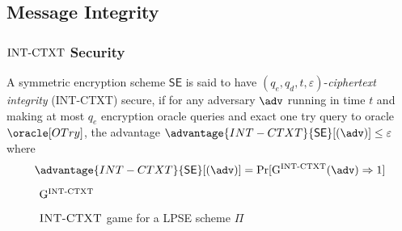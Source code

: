 \subsection{Message Integrity}
\subsubsection{$\mathrm{INT\textrm-CTXT}$ Security}
A symmetric encryption scheme $\mathsf{SE}$ is said to have $(q_e, q_d, t, \varepsilon)$-\textit{ciphertext integrity} (INT-CTXT) secure, if for any adversary $\adv$ running in time $t$ and making at most $q_e$ encryption oracle queries and exact one try query to oracle $\oracle[OTry]$,  the advantage $\advantage{INT-CTXT}{\mathsf{SE}}[(\adv)] \leq \varepsilon$ where 
$$
\advantage{INT-CTXT}{\mathsf{SE}}[(\adv)] = \Pr[\mathrm{G}^{\intctxt}(\adv) \Rightarrow 1]
$$

\begin{figure}[!h]
\centering
\begin{codeframe}[colback = white, width=10.5cm, height=6cm]{$\mathrm{G}^{\mathrm{INT\textrm-CTXT}}$}
\begin{pchstack}[space=0.5cm]
\begin{pcvstack}[space=0.3cm]

\end{pcvstack}

\begin{pcvstack}[space=0.3cm]

\end{pcvstack}
\end{pchstack}
\end{codeframe}
\caption{$\textsc{INT-CTXT}$ game for a LPSE scheme $\Pi$}
\label{fig:int-ctxt-game}
\end{figure}

